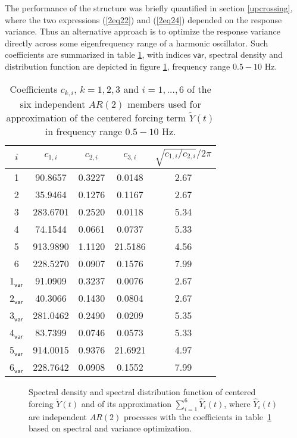 \documentclass[preprint,12pt,authoryear]{elsarticle}
\begin{document}
The performance of the structure was briefly quantified in section \ref{upcrossing}, where the two expressions (\ref{2eq22}) and (\ref{2eq24}) depended on the response variance. Thus an alternative approach is to optimize the response variance directly across some eigenfrequency range of a harmonic oscillator. Such coefficients are summarized in table \ref{3tab2}, with indices $\mathsf{var}$, spectral density and distribution function are depicted in figure \ref{3fig5}, frequency range $0.5-10$ Hz.
\begin{table}
	\centering
	\caption{Coefficients $c_{k,i}$, $k=1,2,3$ and $i=1,\dots,6$ of the six independent $AR(2)$ members used for approximation of the centered forcing term $\tilde{Y}(t)$ in frequency range $0.5-10$ Hz.}
	\begin{tabular}{|c|c|c|c|c|}\hline
	$i$ & $c_{1,i}$ & $c_{2,i}$ & $c_{3,i}$ & $\sqrt{c_{1,i}/c_{2,i}}/2\pi$ \\\hline
	1 & 90.8657 & 0.3227 & 0.0148 & 2.67 \\
	2 & 35.9464 & 0.1276 & 0.1167 & 2.67 \\
	3 & 283.6701 & 0.2520 & 0.0118 & 5.34 \\
	4 & 74.1544 & 0.0661 & 0.0737 & 5.33 \\
	5 & 913.9890 & 1.1120 & 21.5186 & 4.56 \\
	6 & 228.5270 & 0.0907 & 0.1576 & 7.99 \\\hline
  1$_{\mathsf{var}}$ & 91.0909 & 0.3237 & 0.0076 & 2.67 \\
	2$_{\mathsf{var}}$ & 40.3066 & 0.1430 & 0.0804 & 2.67 \\
	3$_{\mathsf{var}}$ & 281.0462 & 0.2490 & 0.0209 & 5.35 \\
	4$_{\mathsf{var}}$ & 83.7399 & 0.0746 & 0.0573 & 5.33 \\
	5$_{\mathsf{var}}$ & 914.0015 & 0.9376 & 21.6921 & 4.97 \\
	6$_{\mathsf{var}}$ & 228.7642 & 0.0908 & 0.1552 & 7.99 \\\hline
	\end{tabular}
	\label{3tab2}
\end{table}
\begin{figure}
	\centering
	\caption{Spectral density and spectral distribution function of centered forcing $\tilde{Y}(t)$ and of its approximation $\sum_{i=1}^6\hat{Y}_i(t)$, where $\hat{Y}_i(t)$ are independent $AR(2)$ processes with the coefficients in table~\ref{3tab2} based on spectral and variance optimization.}
	\label{3fig5}
\end{figure}
\end{document}
